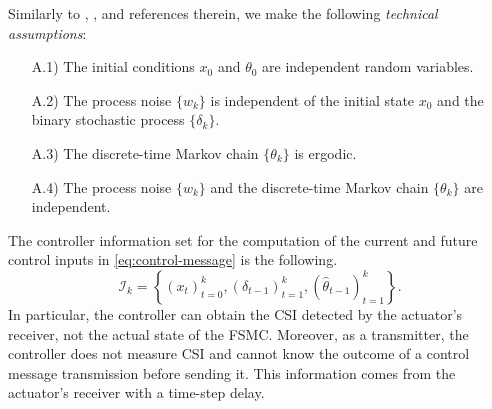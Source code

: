 \documentclass[journal,twoside,web]{ieeecolor}
\begin{document}
Similarly to \cite{yZL-2025-automatica}, \cite{impicciatore2024tac}, and references therein, we make the following \emph{technical assumptions}:
\begin{enumerate}
	\item[A.1)] The initial conditions $x_0$ and $\theta_0$ are independent random variables.
	\item[A.2)] The process noise $\{w_k\}$ is independent of the initial state $x_0$ and the binary stochastic process $\{\delta_k\}$.
	\item[A.3)] The discrete-time Markov chain $\{\theta_k\}$ is ergodic.
	\item[A.4)] The process noise $\{w_k\}$ and the discrete-time Markov chain $\{\theta_k\}$ are independent.
\end{enumerate}

The controller information set for the computation of the current and future control inputs in \eqref{eq:control-message} is the following.
	\begin{equation}\label{eq:info-set}
\mathcal{I}_{k} = \left\{
	\left(x_{t}\right)_{t=0}^{k}, 
	\left(\delta_{t-1}\right)_{t=1}^{k}, 
	(\hat{\theta}_{t-1})_{t=1}^{k} \right\}.
\end{equation}
In particular, the controller can obtain the CSI detected by the actuator's receiver, not the actual state of the FSMC. Moreover, as a transmitter, the controller does not measure CSI and cannot know the outcome of a control message transmission before sending it. This information comes from the actuator's receiver with a time-step delay.
\end{document}

